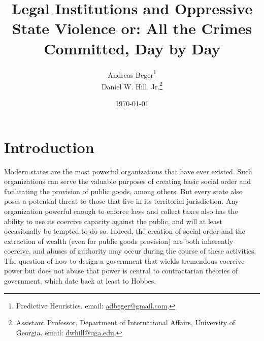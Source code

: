 \documentclass[12pt]{article}
\begin{document}
\date{\today}
\title{Legal Institutions and Oppressive State Violence or: All the Crimes Committed, Day by Day}
\author{Andreas Beger\thanks{Predictive Heuristics. email: \href{mailto:adbeger@gmail.com}{adbeger@gmail.com}.} \\
Daniel W. Hill, Jr.\thanks{Assistant Professor, Department of International Affairs, University of Georgia. email: \href{mailto:dwhill@uga.edu}{dwhill@uga.edu}.}}

\maketitle 

\begin{abstract}

\end{abstract}

\clearpage
\setcounter{page}{1}

\doublespace

\section*{Introduction}

Modern states are the most powerful organizations that have ever existed. Such organizations can serve the valuable purposes of creating basic social order and facilitating the provision of public goods, among others. But every state also poses a potential threat to those that live in its territorial jurisdiction. Any organization powerful enough to enforce laws and collect taxes also has the ability to use its coercive capacity against the public, and will at least occasionally be tempted to do so. Indeed, the creation of social order and the extraction of wealth (even for public goods provision) are both inherently coercive, and abuses of authority may occur during the course of these activities. The question of how to design a government that wields tremendous coercive power but does not abuse that power is central to contractarian theories of government, which date back at least to Hobbes. 
\end{document}
